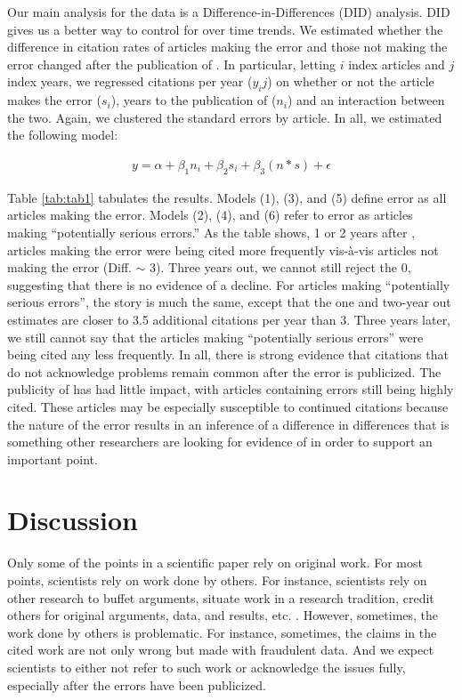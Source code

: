 \documentclass[12pt, letterpaper]{article}
\begin{document}
Our main analysis for the \citeauthor{nieuwenhuis2011} data is a Difference-in-Differences (DID) analysis. DID gives us a better way to control for over time trends. We estimated whether the difference in citation rates of articles making the error and those not making the error changed after the publication of \citet{nieuwenhuis2011}. In particular, letting $i$ index articles and $j$ index years, we regressed citations per year ($y_ij$) on whether or not the article makes the error ($s_i$), years to the publication of \citeauthor{nieuwenhuis2011} ($n_i$) and an interaction between the two. Again, we clustered the standard errors by article. In all, we estimated the following model:

\begin{align}
\label{eqn:eqn2}
y = \alpha + \beta_1 n_i + \beta_2 s_i + \beta_3 (n*s) + \epsilon
\end{align}

Table \ref{tab:tab1} tabulates the results. Models (1), (3), and (5) define error as all articles making the error. Models (2), (4), and (6) refer to error as articles making ``potentially serious errors.'' As the table shows, 1 or 2 years after \citet{nieuwenhuis2011}, articles making the error were being cited more frequently vis-\`a-vis articles not making the error (Diff. $\sim$ 3). Three years out, we cannot still reject the 0, suggesting that there is no evidence of a decline. For articles making ``potentially serious errors'', the story is much the same, except that the one and two-year out estimates are closer to 3.5 additional citations per year than 3. Three years later, we still cannot say that the articles making ``potentially serious errors'' were being cited any less frequently.  In all, there is strong evidence that citations that do not acknowledge problems remain common after the error is publicized. The publicity of \citeauthor{nieuwenhuis2011} has had little impact, with articles containing errors still being highly cited. These articles may be especially susceptible to continued citations because the nature of the error results in an inference of a difference in differences that is something other researchers are looking for evidence of in order to support an important point.



\section{Discussion}
Only some of the points in a scientific paper rely on original work. For most points, scientists rely on work done by others. For instance, scientists rely on other research to buffet arguments, situate work in a research tradition, credit others for original arguments, data, and results, etc. \citep{erikson2014taxonomy}. However,  sometimes, the work done by others is problematic. For instance, sometimes, the claims in the cited work are not only wrong but made with fraudulent data. And we expect scientists to either not refer to such work or acknowledge the issues fully, especially after the errors have been publicized.
\end{document}
